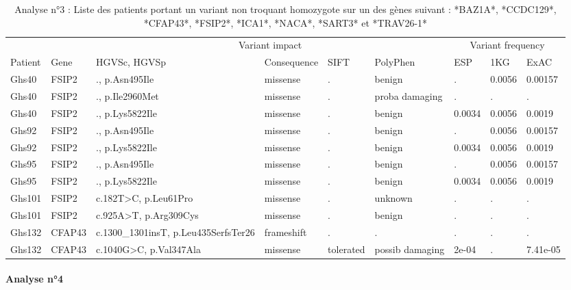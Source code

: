 \documentclass[12pt,twoside]{reedthesis}
\theoremstyle{definition}
\theoremstyle{definition}
\theoremstyle{remark}
\begin{document}
  \begin{landscape}
  \begin{longtable}[t]{llp{11em}llllll}
  \caption{\label{tab:tabgrp2low}Analyse n°3 : Liste des patients portant un variant non troquant homozygote sur un des gènes suivant : *BAZ1A*, *CCDC129*, *CFAP43*, *FSIP2*, *ICA1*, *NACA*, *SART3*  et  *TRAV26-1*}\\
  \toprule
  \multicolumn{1}{c}{ } & \multicolumn{1}{c}{ } & \multicolumn{4}{c}{Variant impact} & \multicolumn{3}{c}{Variant frequency} \\
  \cmidrule(l{2pt}r{2pt}){3-6} \cmidrule(l{2pt}r{2pt}){7-9}
  Patient & Gene & HGVSc, HGVSp & Consequence & SIFT & PolyPhen & ESP & 1KG & ExAC\\
  \midrule
  Ghs40 & FSIP2 & ., p.Asn495Ile & missense & . & benign & . & 0.0056 & 0.00157\\
  Ghs40 & FSIP2 & ., p.Ile2960Met & missense & . & proba damaging & . & . & .\\
  Ghs40 & FSIP2 & ., p.Lys5822Ile & missense & . & benign & 0.0034 & 0.0056 & 0.0019\\
  Ghs92 & FSIP2 & ., p.Asn495Ile & missense & . & benign & . & 0.0056 & 0.00157\\
  Ghs92 & FSIP2 & ., p.Lys5822Ile & missense & . & benign & 0.0034 & 0.0056 & 0.0019\\
  \addlinespace
  Ghs95 & FSIP2 & ., p.Asn495Ile & missense & . & benign & . & 0.0056 & 0.00157\\
  Ghs95 & FSIP2 & ., p.Lys5822Ile & missense & . & benign & 0.0034 & 0.0056 & 0.0019\\
  Ghs101 & FSIP2 & c.182T>C, p.Leu61Pro & missense & . & unknown & . & . & .\\
  Ghs101 & FSIP2 & c.925A>T, p.Arg309Cys & missense & . & benign & . & . & .\\
  Ghs132 & CFAP43 & c.1300\_1301insT, p.Leu435SerfsTer26 & frameshift & . & . & . & . & .\\
  Ghs132 & CFAP43 & c.1040G>C, p.Val347Ala & missense & tolerated & possib damaging & 2e-04 & . & 7.41e-05\\
  \bottomrule
  \end{longtable}
  \end{landscape}
  
  \newpage
  
  \paragraph{Analyse n°4}\label{analyse-n4}
  
\end{document}
